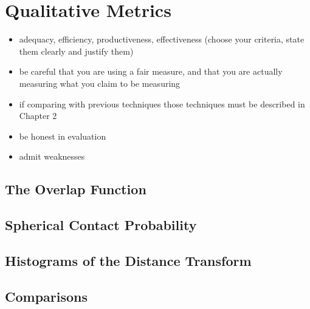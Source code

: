 
\chapter{Qualitative Metrics}

\mynote
{
\begin{itemize}
\item adequacy, efficiency, productiveness, effectiveness (choose your criteria, state them clearly and justify them)
\item be careful that you are using a fair measure, and that you are actually measuring what you claim to be measuring
\item if comparing with previous techniques those techniques must be described in Chapter 2
\item be honest in evaluation
\item admit weaknesses
\end{itemize}
}

\section{The Overlap Function}


\section{Spherical Contact Probability}


\section{Histograms of the Distance Transform}


\section{Comparisons}


